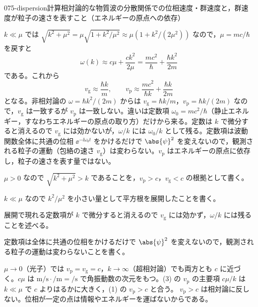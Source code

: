 \documentclass[uplatex,dvipdfmx,a4paper,11pt]{jsarticle}
\begin{document}
\begin{mondai}{075-dispersion}{計算}{相対論的な物質波の分散関係での位相速度・群速度と，群速度が粒子の速さを表すこと（エネルギーの原点への依存）}
\begin{tadashii}
 $k\ll\mu$ では $\sqrt{k^{2}+\mu^{2}}=\mu\sqrt{1+k^{2}/\mu^{2}}\approx\mu(1+k^{2}/(2\mu^{2}))$ なので，$\mu=mc/\hbar$ を戻すと
\[ \omega(k)\approx c\mu+\frac{ck^{2}}{2\mu}=\frac{mc^{2}}{\hbar}+\frac{\hbar k^{2}}{2m} \]
である。これから
\[ v_{\mathrm{g}}\approx\frac{\hbar k}{m},\qquad v_{\mathrm{p}}\approx\frac{mc^{2}}{\hbar k}+\frac{\hbar k}{2m} \]
となる。非相対論の $\omega=\hbar k^{2}/(2m)$ からは $v_{\mathrm{g}}=\hbar k/m$，$v_{\mathrm{p}}=\hbar k/(2m)$ なので，$v_{\mathrm{g}}$ は一致するが $v_{\mathrm{p}}$ は一致しない。違いは定数項 $\omega_{0}=mc^{2}/\hbar$（静止エネルギー，すなわちエネルギーの原点の取り方）だけから来る。定数は $k$ で微分すると消えるので $v_{\mathrm{g}}$ には効かないが，$\omega/k$ には $\omega_{0}/k$ として残る。定数項は波動関数全体に共通の位相 $\ee^{-\ii\omega_{0}t}$ をかけるだけで $\abs{\psi}^{2}$ を変えないので，観測される粒子の運動（包絡の速さ $v_{\mathrm{g}}$）は変わらない。$v_{\mathrm{p}}$ はエネルギーの原点に依存し，粒子の速さを表す量ではない。
\begin{ronten}
  \item {} $\mu>0$ なので $\sqrt{k^{2}+\mu^{2}}>k$ であることを，$v_{\mathrm{p}}>c$，$v_{\mathrm{g}}<c$ の根拠として書く。
  \item {} $k\ll\mu$ なので $k^{2}/\mu^{2}$ を小さい量として平方根を展開したことを書く。
  \item {} 展開で現れる定数項が $k$ で微分すると消えるので $v_{\mathrm{g}}$ には効かず，$\omega/k$ には残ることを述べる。
  \item {} 定数項は全体に共通の位相をかけるだけで $\abs{\psi}^{2}$ を変えないので，観測される粒子の運動は変わらないことを書く。
\end{ronten}
\kenzan $\mu\to0$（光子）では $v_{\mathrm{p}}=v_{\mathrm{g}}=c$，$k\to\infty$（超相対論）でも両方とも $c$ に近づく。$c\mu$ は $\unit{\metre\per\second}\cdot\unit{\per\metre}=\unit{\per\second}$ で角振動数の次元をもつ。(3) の $v_{\mathrm{p}}$ の主要項 $c\mu/k$ は $k\ll\mu$ で $c$ よりはるかに大きく，(1) の $v_{\mathrm{p}}>c$ と合う。
\tsumazuki $v_{\mathrm{p}}>c$ は相対論に反しない。位相が一定の点は情報やエネルギーを運ばないからである。
\end{tadashii}
\end{mondai}
\end{document}
